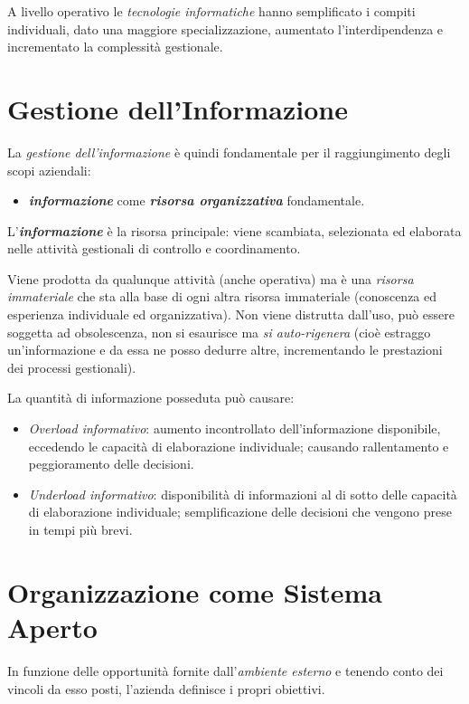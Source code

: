 \documentclass[a4paper, notitlepage, 9pt]{extreport}
\begin{document}
A livello operativo le \textit{tecnologie informatiche} hanno semplificato i compiti individuali, dato una maggiore specializzazione, aumentato l'interdipendenza e incrementato la complessità gestionale.

\section*{Gestione dell'Informazione}
La \textit{gestione dell’informazione} è quindi fondamentale per il raggiungimento degli scopi aziendali:
\begin{itemize}
	\item \textit{\textbf{informazione}} come \textit{\textbf{risorsa organizzativa}} fondamentale.
\end{itemize}
\noindent
L'\textit{\textbf{informazione}} è la risorsa principale: viene scambiata, selezionata ed elaborata nelle attività gestionali di controllo e coordinamento.

Viene prodotta da qualunque attività (anche operativa) ma è una \textit{risorsa immateriale} che sta alla base di ogni altra risorsa immateriale (conoscenza ed esperienza individuale ed organizzativa). Non viene distrutta dall'uso, può essere soggetta ad obsolescenza, non si esaurisce ma \textit{si auto-rigenera} (cioè estraggo un'informazione e da essa ne posso dedurre altre, incrementando le prestazioni dei processi gestionali).
\newline

\noindent
La quantità di informazione posseduta può causare:
\begin{itemize}
	\item \textit{Overload informativo}: aumento incontrollato dell'informazione disponibile, eccedendo le capacità di elaborazione individuale; causando rallentamento e peggioramento delle decisioni.
	\item \textit{Underload informativo}: disponibilità di informazioni al di sotto delle capacità di elaborazione individuale; semplificazione delle decisioni che vengono prese in tempi più brevi.
\end{itemize}

\section*{Organizzazione come Sistema Aperto}
In funzione delle opportunità fornite dall’\textit{ambiente
esterno} e tenendo conto dei vincoli da esso posti, l’azienda definisce i propri obiettivi.
\end{document}
